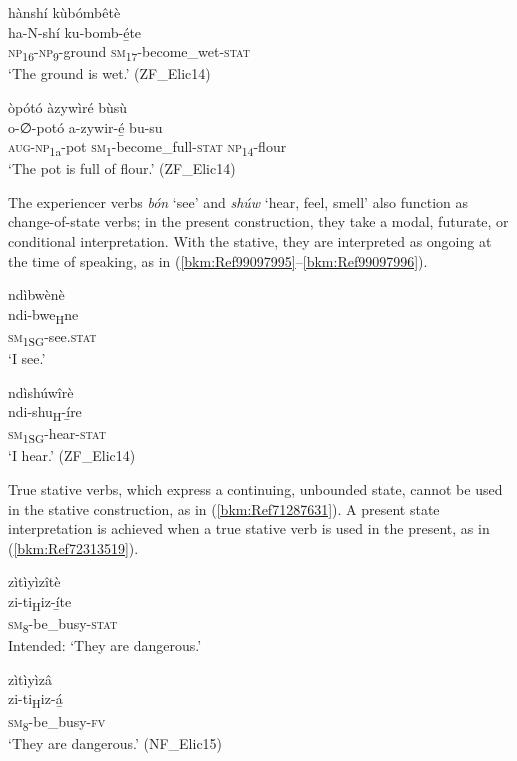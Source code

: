 \ea
\label{bkm:Ref71287557}
hànshí kùbómbêtè\\
\gll ha-N-shí    ku-bomb-é̲te\\
\textsc{np}\textsubscript{16}-\textsc{np}\textsubscript{9}-ground  \textsc{sm}\textsubscript{17}-become\_wet-\textsc{stat}\\
\glt ‘The ground is wet.’ (ZF\_Elic14)
\z

\ea
\label{bkm:Ref71287558}
òpótó àzywìré bùsù\\
\gll o-∅-potó    a-zywir-é̲      bu-su\\
\textsc{aug}-\textsc{np}\textsubscript{1a}-pot  \textsc{sm}\textsubscript{1}-become\_full-\textsc{stat}  \textsc{np}\textsubscript{14}-flour\\
\glt ‘The pot is full of flour.’ (ZF\_Elic14)
\z

The experiencer verbs \textit{bón} ‘see’ and \textit{shúw} ‘hear, feel, smell’ also function as change-of-state verbs; in the present construction, they take a modal, futurate, or conditional interpretation. With the stative, they are interpreted as ongoing at the time of speaking, as in (\ref{bkm:Ref99097995}--\ref{bkm:Ref99097996}).

\ea
\label{bkm:Ref99097995}
\glll ndìbwènè\\
ndi-bwe\textsubscript{H}ne\\
\textsc{sm}\textsubscript{1SG}-see.\textsc{stat}\\
\glt ‘I see.’
\z

\ea
\label{bkm:Ref99097996}
\glll ndìshúwîrè\\
ndi-shu\textsubscript{H}-í̲re\\
\textsc{sm}\textsubscript{1SG}-hear-\textsc{stat}\\
\glt ‘I hear.’ (ZF\_Elic14)
\z

True stative verbs, which express a continuing, unbounded state, cannot be used in the stative construction, as in (\ref{bkm:Ref71287631}). A present state interpretation is achieved when a true stative verb is used in the present, as in (\ref{bkm:Ref72313519}).

\ea
\label{bkm:Ref71287631}
\glll *zìtìyìzîtè \\
zi-ti\textsubscript{H}iz-í̲te\\
\textsc{sm}\textsubscript{8}-be\_busy-\textsc{stat}\\
\glt Intended: ‘They are dangerous.’
\z

\ea
\label{bkm:Ref72313519}
\glll zìtìyìzâ\\
zi-ti\textsubscript{H}iz-á̲\\
\textsc{sm}\textsubscript{8}-be\_busy-\textsc{fv}\\
\glt ‘They are dangerous.’ (NF\_Elic15)
\z

